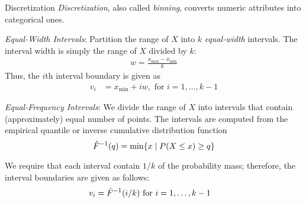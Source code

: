\begin{frame}{Discretization}
\small
{\em Discretization}, also called {\em binning},
converts numeric attributes into categorical ones.

\medskip
{\em Equal-Width Intervals}:
Partition
the range of $X$
into $k$ {\em equal-width} intervals.
The interval width is simply the range of $X$ divided by $k$:
\begin{align*}
  w = \frac{x_{\max} - x_{\min}}{k}
\end{align*}
Thus, the $i$th interval boundary is given as
\begin{align*}
  v_i & = x_{\min} + iw, \text{ for } i=1,\ldots,k-1
\end{align*}
%

\medskip
{\em Equal-Frequency Intervals}:
We divide the range of $X$ into
intervals that contain (approximately) equal number of points.
The intervals are computed from the empirical
quantile or inverse cumulative
distribution function
$$\hat{F}^{-1}(q) = \min\{x\;|\; P(X \le x) \ge q\}$$

We require that each interval contain $1/k$ of the
probability mass; therefore, the interval boundaries are given
as follows:
\begin{align*}
  v_i & = \hat{F}^{-1}( i/k ) \text{ for } i=1,\ldots,k-1
\end{align*}
\end{frame}



